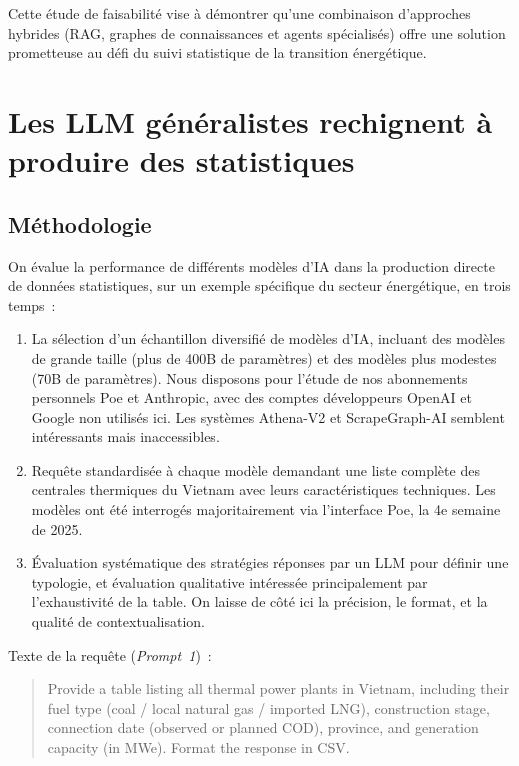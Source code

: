 \documentclass[a4paper,11pt]{report}
\providecommand{\tightlist}{\setlength{\itemsep}{0pt}\setlength{\parskip}{0pt}}
\begin{document}
Cette étude de faisabilité vise à démontrer qu'une combinaison d'approches hybrides (RAG, graphes de connaissances et agents spécialisés) offre une solution prometteuse au défi du suivi statistique de la transition énergétique.

\chapter{Les LLM généralistes rechignent à produire des statistiques}\label{les-llm-guxe9nuxe9ralistes-rechignent-uxe0-produire-des-statistiques}

\section{Méthodologie}\label{muxe9thodologie}

On évalue la performance de différents modèles d'IA dans la production directe de données statistiques, sur un exemple spécifique du secteur énergétique, en trois temps~:

\begin{enumerate}
\def\labelenumi{\arabic{enumi}.}
\tightlist
\item
  La sélection d'un échantillon diversifié de modèles d'IA, incluant des modèles de grande taille (plus de 400B de paramètres) et des modèles plus modestes (70B de paramètres). Nous disposons pour l'étude de nos abonnements personnels Poe et Anthropic, avec des comptes développeurs OpenAI et Google non utilisés ici. Les systèmes Athena-V2 et ScrapeGraph-AI semblent intéressants mais inaccessibles.
\item
  Requête standardisée à chaque modèle demandant une liste complète des centrales thermiques du Vietnam avec leurs caractéristiques techniques. Les modèles ont été interrogés majoritairement via l'interface Poe, la 4e semaine de 2025.
\item
  Évaluation systématique des stratégies réponses par un LLM pour définir une typologie, et évaluation qualitative intéressée principalement par l'exhaustivité de la table. On laisse de côté ici la précision, le format, et la qualité de contextualisation.
\end{enumerate}

Texte de la requête (\emph{\emph{Prompt~1}})~:

\begin{quote}
Provide a table listing all thermal power plants in Vietnam, including their fuel type (coal / local natural gas / imported LNG), construction stage, connection date (observed or planned COD), province, and generation capacity (in MWe). Format the response in CSV.
\end{quote}
\end{document}
